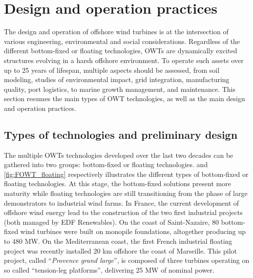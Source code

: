 \section{Design and operation practices} \label{sec:owt_design}

The design and operation of offshore wind turbines is at the intersection of various engineering, environmental and social considerations. 
Regardless of the different bottom-fixed or floating technologies, OWTs are dynamically excited structures evolving in a harsh offshore environment.   
To operate such assets over up to 25 years of lifespan, multiple aspects should be assessed, from soil modeling, studies of environmental impact, grid integration, manufacturing quality, port logistics, to marine growth management, and maintenance. 
This section resumes the main types of OWT technologies, as well as the main design and operation practices.   

\subsection{Types of technologies and preliminary design}
The multiple OWTs technologies developed over the last two decades can be gathered into two groups: bottom-fixed or floating technologies. 
 and \ref{fig:FOWT_floating} respectively illustrates the different types of bottom-fixed or floating technologies. 
At this stage, the bottom-fixed solutions present more maturity while floating technologies are still transitioning from the phase of large demonstrators to industrial wind farms. 
In France, the current development of offshore wind energy lead to the construction of the two first industrial projects (both managed by EDF Renewables). 
On the coast of Saint-Nazaire, 80 bottom-fixed wind turbines were built on monopile foundations, altogether producing up to 480 MW. 
On the Mediterranean coast, the first French industrial floating project was recently installed 20 km offshore the coast of Marseille. 
This pilot project, called ``\textit{Provence grand large}'', is composed of three turbines operating on so called ``tension-leg platforms'', delivering 25 MW of nominal power.     

